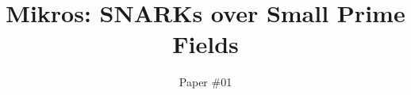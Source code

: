 \documentclass[runningheads]{llncs}
\begin{document}
\title{Mikros: SNARKs over Small Prime Fields}


\author{Paper \#01 \institute{\,} }

%
\maketitle
\end{document}
